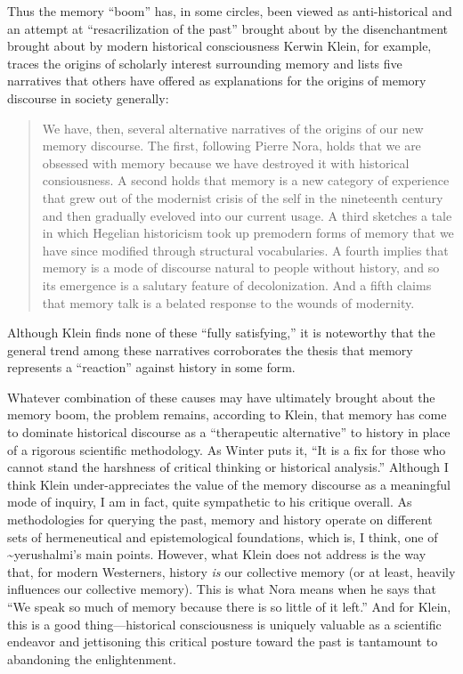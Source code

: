 Thus the memory ``boom'' has, in some circles, been viewed as
anti-historical and an attempt at ``resacrilization of the past''
brought about by the disenchantment brought about by modern historical
consciousness\autocite[282]{winter2006} Kerwin Klein, for example,
traces the origins of scholarly interest surrounding memory and lists
five narratives that others have offered as explanations for the origins
of memory discourse in society generally:

\begin{quote}
We have, then, several alternative narratives of the origins of our new
memory discourse. The first, following Pierre Nora, holds that we are
obsessed with memory because we have destroyed it with historical
consiousness. A second holds that memory is a new category of experience
that grew out of the modernist crisis of the self in the nineteenth
century and then gradually eveloved into our current usage. A third
sketches a tale in which Hegelian historicism took up premodern forms of
memory that we have since modified through structural vocabularies. A
fourth implies that memory is a mode of discourse natural to people
without history, and so its emergence is a salutary feature of
decolonization. And a fifth claims that memory talk is a belated
response to the wounds of modernity.\autocite[134]{klein_klein2011}
\end{quote}

Although Klein finds none of these ``fully satisfying,'' it is
noteworthy that the general trend among these narratives corroborates
the thesis that memory represents a ``reaction'' against history in some
form.

Whatever combination of these causes may have ultimately brought about
the memory boom, the problem remains, according to Klein, that memory
has come to dominate historical discourse as a ``therapeutic
alternative'' to history in place of a rigorous scientific
methodology.\autocite[137]{klein2011} As Winter puts it, ``It is a fix
for those who cannot stand the harshness of critical thinking or
historical analysis.''\autocite[283 (summarizing Klein)]{winter2006}
Although I think Klein under-appreciates the value of the memory
discourse as a meaningful mode of inquiry, I am in fact, quite
sympathetic to his critique overall. As methodologies for querying the
past, memory and history operate on different sets of hermeneutical and
epistemological foundations, which is, I think, one of
\textasciitilde{}yerushalmi's main points. However, what Klein does not
address is the way that, for modern Westerners, history \emph{is} our
collective memory (or at least, heavily influences our collective
memory). This is what Nora means when he says that ``We speak so much of
memory because there is so little of it
left.''\autocite[7]{nora_representations1989} And for Klein, this is a
good thing---historical consciousness is uniquely valuable as a
scientific endeavor and jettisoning this critical posture toward the
past is tantamount to abandoning the enlightenment.

